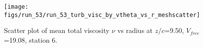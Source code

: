 \begin{figure}[H]
\centering
\texttt{[image: figs/run\_53/run\_53\_turb\_visc\_by\_vtheta\_vs\_r\_meshscatter]}
\caption{Scatter plot of mean total viscosity $\nu$ vs radius at $z/c$=9.50, $V_{free}$=19.08, station 6.}
\label{fig:run_53_turb_visc_by_vtheta_vs_r_meshscatter}
\end{figure}


